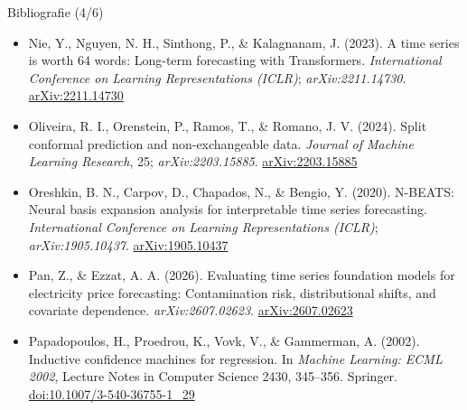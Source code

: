 \begin{frame}{Bibliografie (4/6)}
\begin{itemize}
    \item Nie, Y., Nguyen, N. H., Sinthong, P., \& Kalagnanam, J. (2023). A time series is worth 64 words: Long-term forecasting with Transformers. \textit{International Conference on Learning Representations (ICLR)}; \textit{arXiv:2211.14730}. \href{https://arxiv.org/abs/2211.14730}{arXiv:2211.14730}
    \item Oliveira, R. I., Orenstein, P., Ramos, T., \& Romano, J. V. (2024). Split conformal prediction and non-exchangeable data. \textit{Journal of Machine Learning Research}, 25; \textit{arXiv:2203.15885}. \href{https://arxiv.org/abs/2203.15885}{arXiv:2203.15885}
    \item Oreshkin, B. N., Carpov, D., Chapados, N., \& Bengio, Y. (2020). N-BEATS: Neural basis expansion analysis for interpretable time series forecasting. \textit{International Conference on Learning Representations (ICLR)}; \textit{arXiv:1905.10437}. \href{https://arxiv.org/abs/1905.10437}{arXiv:1905.10437}
    \item Pan, Z., \& Ezzat, A. A. (2026). Evaluating time series foundation models for electricity price forecasting: Contamination risk, distributional shifts, and covariate dependence. \textit{arXiv:2607.02623}. \href{https://arxiv.org/abs/2607.02623}{arXiv:2607.02623}
    \item Papadopoulos, H., Proedrou, K., Vovk, V., \& Gammerman, A. (2002). Inductive confidence machines for regression. In \textit{Machine Learning: ECML 2002}, Lecture Notes in Computer Science 2430, 345--356. Springer. \href{https://doi.org/10.1007/3-540-36755-1_29}{doi:10.1007/3-540-36755-1\_29}
\end{itemize}
\end{frame}

